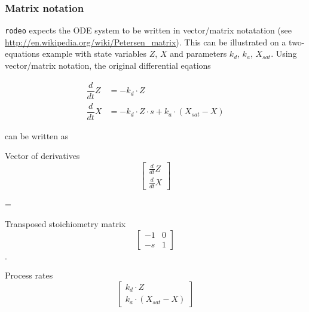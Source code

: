 \documentclass[a4paper]{article}
\newcommand{\rodeo}{\texttt{rodeo}}
\begin{document}
\subsubsection{Matrix notation} \label{sec:input:conventions:matrix}
\rodeo{} expects the ODE system to be written in vector/matrix notatation (see \url{http://en.wikipedia.org/wiki/Petersen_matrix}). This can be illustrated on a two-equations example with state variables $Z$, $X$ and parameters $k_d$, $k_a$, $X_{sat}$. Using vector/matrix notation, the original differential eqations 

\begin{align}
  \dfrac{d}{dt} Z &= -k_d \cdot Z \nonumber \\
  \dfrac{d}{dt} X &= -k_d \cdot Z \cdot s + k_a \cdot (X_{sat} - X) \nonumber 
\end{align}

can be written as

\bigskip
\begin{minipage}[b]{0.25\textwidth}
  Vector of derivatives
  \begin{equation*}
  \begin{bmatrix} \frac{d}{dt}Z \\ \frac{d}{dt}X \end{bmatrix}
  \end{equation*}
\end{minipage}
\begin{minipage}[b]{0.1\textwidth}
 =
\end{minipage}
\begin{minipage}[b]{0.25\textwidth}
Transposed stoichiometry matrix
\begin{equation*}
\begin{bmatrix} -1 & 0 \\ -s & 1 \end{bmatrix}
\end{equation*}
\end{minipage}
\begin{minipage}[b]{0.1\textwidth}
 $\cdot$
\end{minipage}
\begin{minipage}[b]{0.25\textwidth}
Process rates
\begin{equation*}
\begin{bmatrix} k_d \cdot Z \\ k_a \cdot (X_{sat} - X) \end{bmatrix}
\end{equation*}
\end{minipage}
\end{document}
